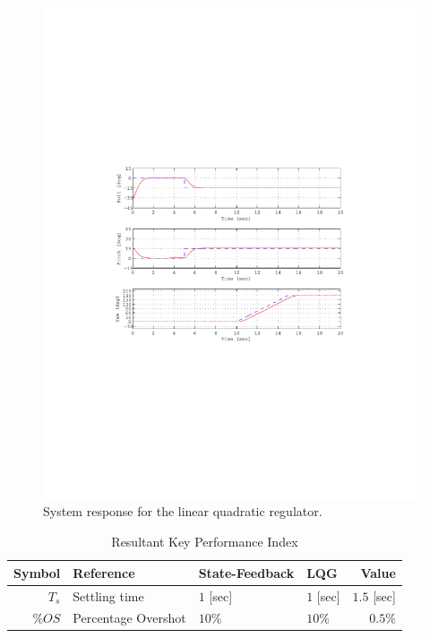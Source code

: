 \documentclass[12pt]{article}
\begin{document}
\begin{figure}[t]
  \centering
  \includegraphics{lqg.pdf}
  \caption{System response for the linear quadratic regulator.}
  \label{fig:res-lqr}
\end{figure}

\begin{table}
  \begin{center}
    \caption{Resultant Key Performance Index}
    \label{tab:results}
    \begin{tabular}{rlllr}
      \hline
      Symbol & Reference & State-Feedback & LQG & Value \\
      \hline                  
      $T_s$ & Settling time & $1$ [sec] & $1$ [sec] & $1.5$ [sec]\\
      $\%OS$ & Percentage Overshot & $10\%$ & $10\%$ & $0.5\%$\\
      \hline
    \end{tabular}
  \end{center}
\end{table}
\end{document}
